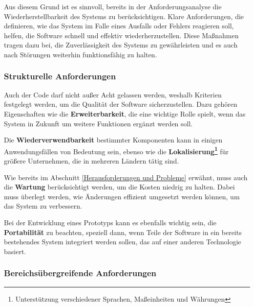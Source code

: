     Aus diesem Grund ist es sinnvoll, bereits in der Anforderungsanalyse die Wiederherstellbarkeit des Systems zu berücksichtigen. Klare Anforderungen, die definieren, wie das System im Falle eines Ausfalls oder Fehlers reagieren soll, helfen, die Software schnell und effektiv wiederherzustellen. Diese Maßnahmen tragen dazu bei, die Zuverlässigkeit des Systems zu gewährleisten und es auch nach Störungen weiterhin funktionsfähig zu halten.
    \cite{EA:Web09}
    
    
    
    \subsubsection{Strukturelle Anforderungen}
    
    Auch der Code darf nicht außer Acht gelassen werden, weshalb Kriterien festgelegt werden, um die Qualität der Software sicherzustellen. Dazu gehören Eigenschaften wie die \textbf{Erweiterbarkeit}, die eine wichtige Rolle spielt, wenn das System in Zukunft um weitere Funktionen ergänzt werden soll.
    
    Die \textbf{Wiederverwendbarkeit} bestimmter Komponenten kann in einigen Anwendungsfällen von Bedeutung sein, ebenso wie die \textbf{Lokalisierung\footnote{Unterstützung verschiedener Sprachen, Maßeinheiten und Währungen}} für größere Unternehmen, die in mehreren Ländern tätig sind.
    
    Wie bereits im Abschnitt \ref{Herausforderungen und Probleme} erwähnt, muss auch die \textbf{Wartung} berücksichtigt werden, um die Kosten niedrig zu halten. Dabei muss überlegt werden, wie Änderungen effizient umgesetzt werden können, um das System zu verbessern.
    
    Bei der Entwicklung eines Prototyps kann es ebenfalls wichtig sein, die \textbf{Portabilität} zu beachten, speziell dann, wenn Teile der Software in ein bereits bestehendes System integriert werden sollen, das auf einer anderen Technologie basiert. \\
    \cite[S. 59-60]{EA:Book02}
    
    
    
    \subsubsection{Bereichsübergreifende Anforderungen}
    
